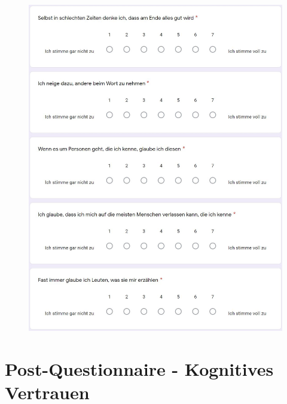 \documentclass[a4paper,11pt]{article}%
\renewcommand{\\}{\vspace*{0.5\baselineskip} \newline}
\begin{document}
	\begin{figure}[H]
		\begin{footnotesize}
			\includegraphics[width=\textwidth]{Abbildungen/Fragebogen/Post-Questionnaire/PQG4}
		\end{footnotesize}
	\end{figure}	

\newpage
\section{Post-Questionnaire - Kognitives Vertrauen}	
\label{Post-Questionnaire - Kognitives Vertrauen}	
\end{document}
